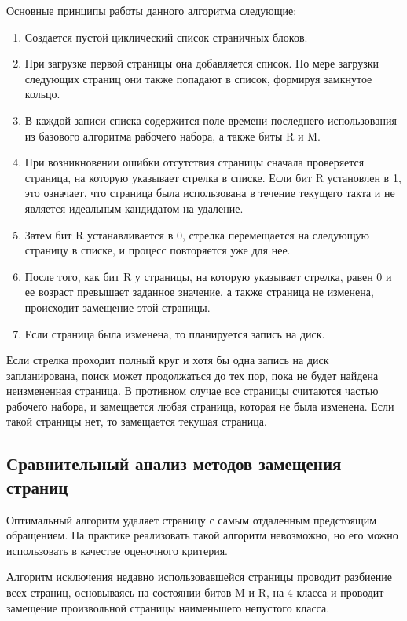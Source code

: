 Основные принципы работы данного алгоритма следующие:
\begin{enumerate}
	\item Создается пустой циклический список страничных блоков.
	\item При загрузке первой страницы она добавляется список. По мере загрузки следующих страниц они также попадают в список, формируя замкнутое кольцо.
	\item В каждой записи списка содержится поле времени последнего использования из базового алгоритма рабочего набора, а также биты R и M.
	\item При возникновении ошибки отсутствия страницы сначала проверяется	страница, на которую указывает стрелка в списке. Если бит R установлен в 1, это означает, что страница была использована в течение	текущего такта и не является идеальным кандидатом на удаление.
	\item Затем бит R устанавливается в 0, стрелка перемещается на следующую страницу в списке, и процесс повторяется уже для нее.
	\item После того, как бит R у страницы, на которую указывает стрелка, 	равен 0 и ее возраст превышает заданное значение, а также страница не изменена, происходит замещение этой страницы.
	\item Если страница была изменена, то планируется запись на диск.
\end{enumerate}

Если стрелка проходит полный круг и хотя бы одна запись на диск запланирована, поиск может продолжаться до тех пор, пока не будет найдена неизмененная страница.
В противном случае все страницы считаются частью рабочего набора, и замещается любая страница, которая не была изменена.
Если такой страницы нет, то замещается текущая страница.

\subsection{Сравнительный анализ методов замещения страниц}

Оптимальный алгоритм удаляет страницу с самым отдаленным предстоящим обращением. 
На практике реализовать такой алгоритм невозможно, но его можно использовать в качестве оценочного критерия.

Алгоритм исключения недавно использовавшейся страницы проводит разбиение всех страниц, основываясь на состоянии битов M и R, на 4 класса и проводит замещение произвольной страницы наименьшего непустого класса.

